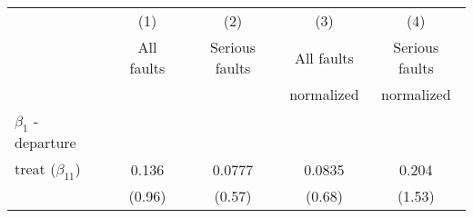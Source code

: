 {
\def\sym#1{\ifmmode^{#1}\else\(^{#1}\)\fi}
\begin{tabular}{l*{4}{c}}
\toprule
                    &\multicolumn{1}{c}{(1)}&\multicolumn{1}{c}{(2)}&\multicolumn{1}{c}{(3)}&\multicolumn{1}{c}{(4)}\\
                    &\multicolumn{1}{c}{All faults}&\multicolumn{1}{c}{Serious faults}&\multicolumn{1}{c}{All faults}&\multicolumn{1}{c}{Serious faults}\\
                    &\multicolumn{1}{c}{}&\multicolumn{1}{c}{}&\multicolumn{1}{c}{normalized}&\multicolumn{1}{c}{normalized}\\
\midrule
$\beta_1$ - departure&                     &                     &                     &                     \\
\addlinespace
treat ($\beta_{11}$)            &       0.136         &      0.0777         &      0.0835         &       0.204         \\
                    &      (0.96)         &      (0.57)         &      (0.68)         &      (1.53)         \\


\end{tabular}}
